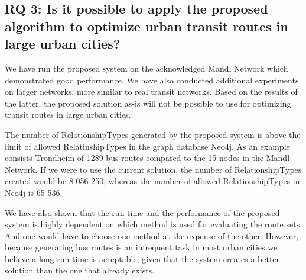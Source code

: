 

\subsection*{RQ 3: Is it possible to apply the proposed algorithm to optimize urban transit routes in large urban cities?}

We have run the proposed system on the acknowledged Mandl Network which demonstrated good performance. We have also conducted additional experiments on larger networks, more similar to real transit networks. Based on the results of the latter, the proposed solution as-is will not be possible to use for optimizing transit routes in large urban cities. \newline

The number of RelationshipTypes generated by the proposed system is above the limit of allowed RelatinshipTypes in the graph database Neo4j. As an example consists Trondheim of 1289 bus routes compared to the 15 nodes in the Mandl Network. If we were to use the current solution, the number of RelationshipTypes created would be 8 056 250, whereas the number of allowed RelationshipTypes in Neo4j is 65 536. \newline

We have also shown that the run time and the performance of the proposed system is highly dependent on which method is used for evaluating the route sets. And one would have to choose one method at the expense of the other. However, because generating bus routes is an infrequent task in most urban cities we believe a long run time is acceptable, given that the system creates a better solution than the one that already exists. 

